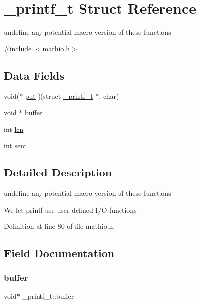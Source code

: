\hypertarget{struct__printf__t}{}\section{\+\_\+printf\+\_\+t Struct Reference}
\label{struct__printf__t}


undefine any potential macro version of these functions  




{\ttfamily \#include $<$mathio.\+h$>$}

\subsection*{Data Fields}
\begin{DoxyCompactItemize}
\item 
void($\ast$ \hyperlink{struct__printf__t_a3ef8eb0143b93d4446b04c6ce9313be7}{put} )(struct \hyperlink{struct__printf__t}{\+\_\+printf\+\_\+t} $\ast$, char)
\item 
void $\ast$ \hyperlink{struct__printf__t_ad35884151d0be6667caafad8caacc76f}{buffer}
\item 
int \hyperlink{struct__printf__t_a5139902cde74159b79e6418a34712bee}{len}
\item 
int \hyperlink{struct__printf__t_a872716fd701166cd57bd3fffb7b77706}{sent}
\end{DoxyCompactItemize}


\subsection{Detailed Description}
undefine any potential macro version of these functions 

We let printf use user defined I/O functions 

Definition at line 80 of file mathio.\+h.



\subsection{Field Documentation}
\mbox{\label{struct__printf__t_ad35884151d0be6667caafad8caacc76f}} 
\subsubsection{\texorpdfstring{buffer}{buffer}}
{\footnotesize\ttfamily void$\ast$ \+\_\+printf\+\_\+t\+::buffer}




